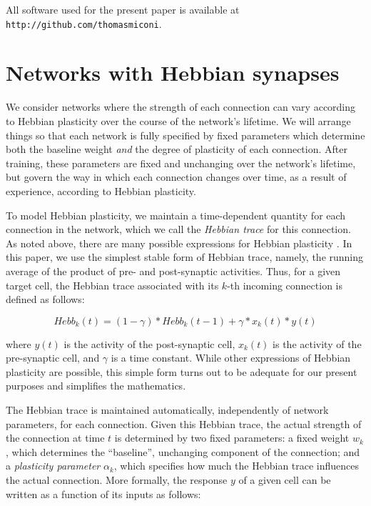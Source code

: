 \documentclass{article}
\begin{document}
All software used for the present paper is available at
\texttt{http://github.com/thomasmiconi}.

\section{Networks with Hebbian synapses}

We consider networks where the strength of each connection can vary according to
Hebbian plasticity over the course of the network's lifetime. We will arrange things so that each network is fully specified
by fixed parameters which determine both the baseline weight \emph{and} the degree of plasticity of each connection.
After training, these parameters are fixed and unchanging over the network's
lifetime, but govern the way in which
each connection changes over time, as a result of experience, according to Hebbian plasticity. 

To model Hebbian plasticity, we maintain a time-dependent quantity for each
connection in the network, which we call the \emph{Hebbian trace} for this
connection.  As noted above, there are many possible expressions for Hebbian
plasticity \cite{Vasilkoski2011-ww}.  In this paper, we use the simplest stable form of Hebbian trace,
namely, the running average of the product of pre- and post-synaptic
activities.  Thus, for a given target cell, the Hebbian trace associated with
its $k$-th incoming connection is defined as follows:

\begin{equation}
\label{eq:hebb}
Hebb_k(t) = (1-\gamma) * Hebb_k(t-1) + \gamma * x_k(t) * y(t)
\end{equation}

where $y(t)$ is the activity of the post-synaptic cell, $x_k(t)$ is the activity
of the pre-synaptic cell, and $\gamma$ is a time constant. While other
expressions of Hebbian plasticity are possible, this simple form turns out to be
adequate for our present purposes and simplifies the mathematics.

The Hebbian trace is maintained automatically, independently of network
parameters, for each connection. Given this Hebbian trace, the
actual strength of the connection at time $t$ is determined by two fixed parameters: a fixed
weight $w_k$, which determines the ``baseline'', unchanging component of the
connection; and a \emph{plasticity parameter} $\alpha_k$, which specifies how
much the Hebbian trace influences the actual connection. More formally, the
response $y$ of a given cell can be written as a function of its inputs as
follows:
\end{document}
